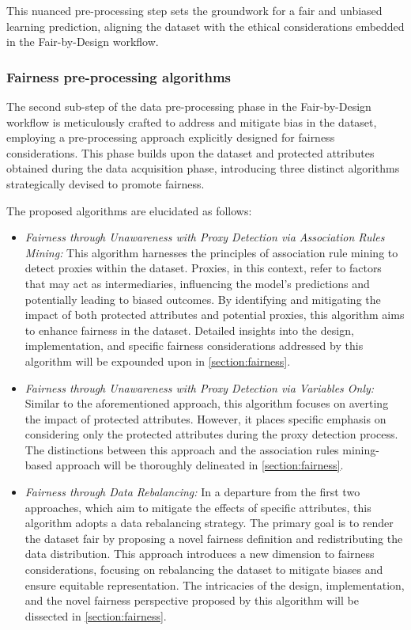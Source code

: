 \documentclass[12pt,a4paper,openright,twoside]{book}
\begin{document}
This nuanced pre-processing step sets the groundwork for a fair and unbiased learning prediction, aligning the dataset with the ethical considerations embedded in the Fair-by-Design workflow.

\subsubsection{Fairness pre-processing algorithms}

The second sub-step of the data pre-processing phase in the Fair-by-Design workflow is meticulously crafted to address and mitigate bias in the dataset, employing a pre-processing approach explicitly designed for fairness considerations. This phase builds upon the dataset and protected attributes obtained during the data acquisition phase, introducing three distinct algorithms strategically devised to promote fairness.

The proposed algorithms are elucidated as follows:

\begin{itemize}

    \item \emph{Fairness through Unawareness with Proxy Detection via Association Rules Mining:} This algorithm harnesses the principles of association rule mining to detect proxies within the dataset. Proxies, in this context, refer to factors that may act as intermediaries, influencing the model's predictions and potentially leading to biased outcomes. By identifying and mitigating the impact of both protected attributes and potential proxies, this algorithm aims to enhance fairness in the dataset. Detailed insights into the design, implementation, and specific fairness considerations addressed by this algorithm will be expounded upon in \cref{section:fairness}.
    
    \item \emph{Fairness through Unawareness with Proxy Detection via Variables Only:} Similar to the aforementioned approach, this algorithm focuses on averting the impact of protected attributes. However, it places specific emphasis on considering only the protected attributes during the proxy detection process. The distinctions between this approach and the association rules mining-based approach will be thoroughly delineated in \cref{section:fairness}.
    
    \item \emph{Fairness through Data Rebalancing:} In a departure from the first two approaches, which aim to mitigate the effects of specific attributes, this algorithm adopts a data rebalancing strategy. The primary goal is to render the dataset fair by proposing a novel fairness definition and redistributing the data distribution. This approach introduces a new dimension to fairness considerations, focusing on rebalancing the dataset to mitigate biases and ensure equitable representation. The intricacies of the design, implementation, and the novel fairness perspective proposed by this algorithm will be dissected in \cref{section:fairness}.

\end{itemize}
\end{document}
